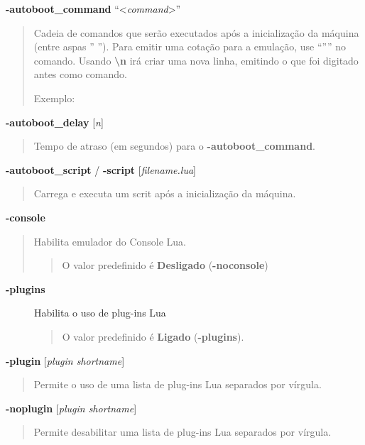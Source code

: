 \documentclass[letterpaper,10pt,brazil]{sphinxmanual}
\begin{document}
\textbf{-autoboot\_command} ``\textless{}\emph{command}\textgreater{}''
\begin{quote}

Cadeia de comandos que serão executados após a inicialização da
máquina (entre aspas '' ''). Para emitir uma cotação para a
emulação, use ``'''' no comando. Usando \textbf{\textbackslash{}n} irá criar uma nova
linha, emitindo o que foi digitado antes como comando.

Exemplo: 
\end{quote}
\label{commandline/commandline-all:mame-commandline-autobootdelay}
\textbf{-autoboot\_delay} {[}\emph{n}{]}
\begin{quote}

Tempo de atraso (em segundos) para o \textbf{-autoboot\_command}.
\end{quote}
\label{commandline/commandline-all:mame-commandline-autobootscript}
\textbf{-autoboot\_script} / \textbf{-script} {[}\emph{filename.lua}{]}
\begin{quote}

Carrega e executa um scrit após a inicialização da máquina.
\end{quote}
\label{commandline/commandline-all:mame-commandline-console}
\textbf{-console}
\begin{quote}

Habilita emulador do Console Lua.
\begin{quote}

O valor predefinido é \textbf{Desligado} (\textbf{-noconsole})
\end{quote}
\end{quote}
\label{commandline/commandline-all:mame-commandline-plugins}\begin{description}
\item[{\textbf{-plugins}}] \leavevmode
Habilita o uso de plug-ins Lua
\begin{quote}

O valor predefinido é \textbf{Ligado} (\textbf{-plugins}).
\end{quote}

\end{description}
\label{commandline/commandline-all:mame-commandline-plugin}
\textbf{-plugin} {[}\emph{plugin shortname}{]}
\begin{quote}

Permite o uso de uma lista de plug-ins Lua separados por vírgula.
\end{quote}
\label{commandline/commandline-all:mame-commandline-noplugin}
\textbf{-noplugin} {[}\emph{plugin shortname}{]}
\begin{quote}

Permite desabilitar uma lista de plug-ins Lua separados por vírgula.
\end{quote}
\end{document}
